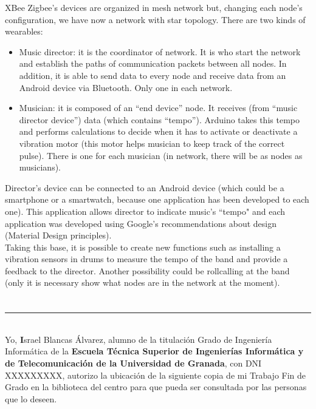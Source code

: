XBee Zigbee’s devices are organized in mesh network but, changing each node’s configuration, we have now a network with
star topology. There are two kinds of wearables:
  \begin{itemize}
  \item Music director: it is the coordinator of network. It is who start the network and establish the paths of communication packets between all nodes. In addition, it is able to send data to every node and receive data from an Android device via Bluetooth. Only one in each network.
  \item Musician: it is composed of an “end device” node. It receives (from “music director device”) data (which contains “tempo”). Arduino takes this tempo and performs calculations to decide when it has to activate or deactivate a vibration motor (this motor helps musician to keep track of the correct pulse). There is one for each musician (in network, there will be as nodes as musicians).
  \end{itemize}


Director’s device can be connected to an Android device (which could be a smartphone or a smartwatch,
because one application has been developed to each one). This application allows director to indicate music’s
``tempo" and each application was developed using Google’s recommendations about design (Material Design principles).\\

Taking this base, it is possible to create new functions such as installing a vibration sensors in drums to measure the
tempo of the band and provide a feedback to the director. Another possibility could be rollcalling at the band (only it
is necessary show what nodes are in the network at the moment).\\


\chapter*{}
\thispagestyle{empty}

\noindent\rule[-1ex]{\textwidth}{2pt}\\[4.5ex]

Yo, \textbf Israel Blancas Álvarez, alumno de la titulación Grado de Ingeniería Informática de la \textbf{Escuela Técnica Superior
de Ingenierías Informática y de Telecomunicación de la Universidad de Granada}, con DNI XXXXXXXXX, autorizo la
ubicación de la siguiente copia de mi Trabajo Fin de Grado en la biblioteca del centro para que pueda ser
consultada por las personas que lo deseen.

